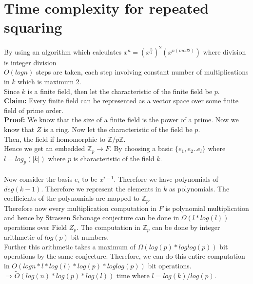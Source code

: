 \documentclass{article}
\begin{document}
\section{Time complexity for repeated squaring}
By using an algorithm which calculates $x^n = (x^{\frac{n}{2}})^2(x^{n(mod2)})$ where division is integer division
\\ $O(logn)$ steps are taken, each step involving constant number of multiplications in $k$ which is maximum 2. \\
Since $k$ is a finite field, then let the characteristic of the finite field be $p$. \\
\textbf{Claim:} Every finite field can be represented as a vector space over some finite field of prime order. \\
\textbf{Proof:} We know that the size of a finite field is the power of a prime. Now we know that $Z$ is a ring. Now let the characteristic of the field be $p$. 
\\ 
Then, the field if homomorphic to $\mathbb{Z}/p\mathbb{Z}$.\\
Hence we get an embedded $\mathbb{Z}_p \rightarrow F$. By choosing a basic $\{e_1,e_2 .. e_l\}$ where $l = log_p(|k|)$ where $p$ is characteristic of the field $k$.
\\ \\
Now consider the basis $e_i$ to be $x^{i-1}$. Therefore we have polynomials of $deg(k-1)$. Therefore we represent the elements in $k$ as polynomials. The coefficients of the polynomials are mapped to $\mathbb{Z}_p$. \\
Therefore now every multiplication computation in $F$ is polynomial multiplication and hence by Strassen Schonage conjecture can be done in $\Omega(l*log(l))$ operations over Field $Z_p$. The computation in $\mathbb{Z}_p$ can be done by integer arithmetic of $log(p)$ bit numbers. \\
Further this arithmetic takes a maximum of $\Omega(log(p)*loglog(p))$ bit operations by the same conjecture. Therefore, we can do this entire computation in $O(logn*l*log(l)*log(p)*loglog(p))$ bit operations.  \\
$\Rightarrow \widetilde{O}(log(n)*log(p)*log(l))$ time where $l = log(k)/log(p)$.
\end{document}
